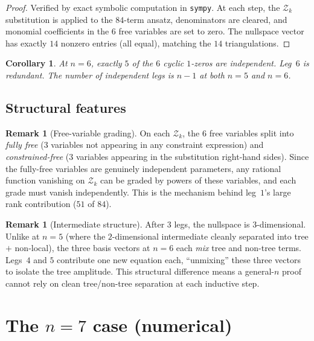 \documentclass[11pt]{article}
\theoremstyle{plain}
\newtheorem{corollary}[theorem]{Corollary}
\theoremstyle{definition}
\newtheorem{remark}[theorem]{Remark}
\newcommand{\cZ}{\mathcal{Z}}
\begin{document}
\begin{proof}
Verified by exact symbolic computation in \texttt{sympy}. At each step, the $\cZ_k$
substitution is applied to the $84$-term ansatz, denominators are cleared, and
monomial coefficients in the $6$ free variables are set to zero.
The nullspace vector has exactly $14$ nonzero entries (all equal), matching the $14$
triangulations.
\end{proof}

\begin{corollary}
At $n=6$, exactly $5$ of the $6$ cyclic $1$-zeros are independent. Leg~$6$ is
redundant. The number of independent legs is $n - 1$ at both $n = 5$ and $n = 6$.
\end{corollary}

\subsection{Structural features}

\begin{remark}[Free-variable grading]
On each $\cZ_k$, the $6$ free variables split into \emph{fully free}
($3$ variables not appearing in any constraint expression) and
\emph{constrained-free} ($3$ variables appearing in the substitution right-hand
sides). Since the fully-free variables are genuinely independent parameters,
any rational function vanishing on $\cZ_k$ can be graded by powers of these
variables, and each grade must vanish independently. This is the mechanism behind
leg~$1$'s large rank contribution ($51$ of $84$).
\end{remark}

\begin{remark}[Intermediate structure]
After $3$ legs, the nullspace is $3$-dimensional. Unlike at $n=5$ (where the
$2$-dimensional intermediate cleanly separated into tree $+$ non-local), the three
basis vectors at $n=6$ each \emph{mix} tree and non-tree terms. Legs~$4$ and $5$
contribute one new equation each, ``unmixing'' these three vectors to isolate the
tree amplitude. This structural difference means a general-$n$ proof cannot rely on
clean tree/non-tree separation at each inductive step.
\end{remark}

\section{The $n=7$ case (numerical)}
\label{sec:n7}
\end{document}
